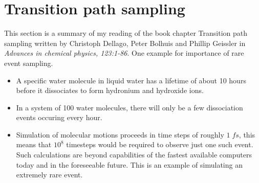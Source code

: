 \documentclass{article}
\begin{document}
\section{Transition path sampling}
This section is a summary of my reading of the book chapter Transition path sampling
written by Christoph Dellago, Peter Bolhuis and Phillip Geissler in \emph{Advances in chemical physics, 123:1-86}.
One example for importance of rare event sampling.
\begin{itemize}
\item A specific water molecule in liquid water has a lifetime of about 10 hours
before it dissociates to form hydronium and hydroxide ions.
\item In a system of 100 water molecules, there will only be a few dissociation events occuring every hour.
\item Simulation of molecular motions proceeds in time steps of roughly $1\;fs$, this means that 
$10^8$ timesteps would be required to observe just one such event. Such calculations are beyond capabilities of 
the fastest available computers today and in the foreseeable future. This is an example of 
simulating an extremely rare event. 
\end{itemize} 
\end{document}
